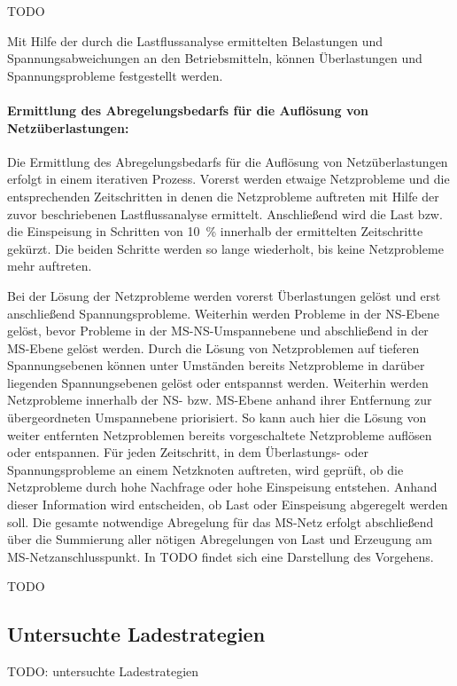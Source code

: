{\color{red} TODO}

Mit Hilfe der durch die Lastflussanalyse ermittelten Belastungen und Spannungsabweichungen an den Betriebsmitteln, können Überlastungen und Spannungsprobleme festgestellt werden.



\paragraph{Ermittlung des Abregelungsbedarfs für die Auflösung von Netzüberlastungen:}

Die Ermittlung des Abregelungsbedarfs für die Auflösung von Netzüberlastungen erfolgt in einem iterativen Prozess.
Vorerst werden etwaige Netzprobleme und die entsprechenden Zeitschritten in denen die Netzprobleme auftreten mit Hilfe der zuvor beschriebenen Lastflussanalyse ermittelt.
Anschließend wird die Last bzw. die Einspeisung in Schritten von \SI{10}{\percent} innerhalb der ermittelten Zeitschritte gekürzt.
Die beiden Schritte werden so lange wiederholt, bis keine Netzprobleme mehr auftreten.\medskip

Bei der Lösung der Netzprobleme werden vorerst Überlastungen gelöst und erst anschließend Spannungsprobleme.
Weiterhin werden Probleme in der \gls{NS}-Ebene gelöst, bevor Probleme in der \gls{MS}-\gls{NS}-Umspannebene und abschließend in der \gls{MS}-Ebene gelöst werden.
Durch die Lösung von Netzproblemen auf tieferen Spannungsebenen können unter Umständen bereits Netzprobleme in darüber liegenden Spannungsebenen gelöst oder entspannst werden.
Weiterhin werden Netzprobleme innerhalb der \gls{NS}- bzw. \gls{MS}-Ebene anhand ihrer Entfernung zur übergeordneten Umspannebene priorisiert.
So kann auch hier die Lösung von weiter entfernten Netzproblemen bereits vorgeschaltete Netzprobleme auflösen oder entspannen.
Für jeden Zeitschritt, in dem Überlastungs- oder Spannungsprobleme an einem Netzknoten auftreten, wird geprüft, ob die Netzprobleme durch hohe Nachfrage oder hohe Einspeisung entstehen.
Anhand dieser Information wird entscheiden, ob Last oder Einspeisung abgeregelt werden soll.
Die gesamte notwendige Abregelung für das \gls{MS}-Netz erfolgt abschließend über die Summierung aller nötigen Abregelungen von Last und Erzeugung am \gls{MS}-Netzanschlusspunkt.
In {\color{red} TODO} findet sich eine Darstellung des Vorgehens.

{\color{red} TODO}


\subsection{Untersuchte Ladestrategien}

{\color{red} TODO: untersuchte Ladestrategien}

